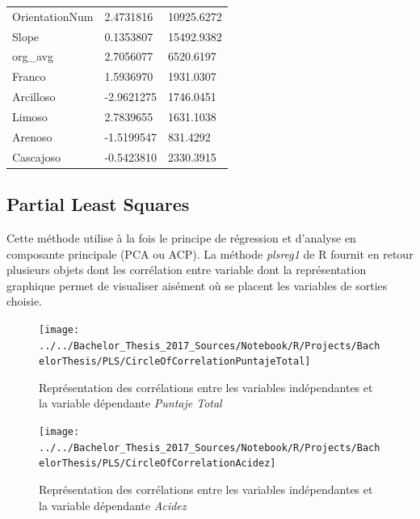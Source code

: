 \begin{table}[H]
\begin{tabular}{lll}
		OrientationNum & 2.4731816  & 10925.6272    \\
		Slope          & 0.1353807  & 15492.9382    \\
		org\_avg       & 2.7056077  & 6520.6197     \\
		Franco         & 1.5936970  & 1931.0307     \\
		Arcilloso      & -2.9621275 & 1746.0451     \\
		Limoso         & 2.7839655  & 1631.1038     \\
		Arenoso        & -1.5199547 & 831.4292      \\
		Cascajoso      & -0.5423810 & 2330.3915    
	\end{tabular}
\end{table}














\newpage

\subsection{Partial Least Squares}
Cette méthode utilise à la fois le principe de régression et d'analyse en composante principale (PCA ou ACP). La méthode \textit{plsreg1} de R fournit en retour plusieurs objets dont les corrélation entre variable dont la représentation graphique permet de visualiser aisément où se placent les variables de sorties choisie. 

\begin{figure}[H]
	\centering
	\texttt{[image: ../../Bachelor\_Thesis\_2017\_Sources/Notebook/R/Projects/BachelorThesis/PLS/CircleOfCorrelationPuntajeTotal]}
	\caption{Représentation des corrélations entre les variables indépendantes et la variable dépendante \textit{Puntaje Total}}
	\label{fig:circleofcorrelationpuntajetotal}
\end{figure}
 
\begin{figure}[H]
	\centering
	\texttt{[image: ../../Bachelor\_Thesis\_2017\_Sources/Notebook/R/Projects/BachelorThesis/PLS/CircleOfCorrelationAcidez]}
	\caption{Représentation des corrélations entre les variables indépendantes et la variable dépendante \textit{Acidez}}
	\label{fig:circleofcorrelationacidez}
\end{figure}

